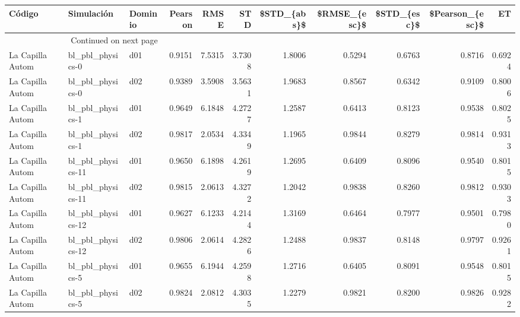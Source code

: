 \begin{longtable}{lllrrrrrrrr}
\toprule
                Código &            Simulación & Dominio &  Pearson &     RMSE &      STD &  \$STD\_\{abs\}\$ &  \$RMSE\_\{esc\}\$ &  \$STD\_\{esc\}\$ &  \$Pearson\_\{esc\}\$ &      ET \\
\midrule
\endhead
\midrule
\multicolumn{3}{r}{{Continued on next page}} \\
\midrule
\endfoot

\bottomrule
\endlastfoot
     La Capilla Autom  &      bl\_pbl\_physics-0 &     d01 &   0.9151 &   7.5315 &   3.7308 &       1.8006 &        0.5294 &       0.6763 &           0.8716 &  0.6924 \\
     La Capilla Autom  &      bl\_pbl\_physics-0 &     d02 &   0.9389 &   3.5908 &   3.5631 &       1.9683 &        0.8567 &       0.6342 &           0.9109 &  0.8006 \\
     La Capilla Autom  &      bl\_pbl\_physics-1 &     d01 &   0.9649 &   6.1848 &   4.2727 &       1.2587 &        0.6413 &       0.8123 &           0.9538 &  0.8025 \\
     La Capilla Autom  &      bl\_pbl\_physics-1 &     d02 &   0.9817 &   2.0534 &   4.3349 &       1.1965 &        0.9844 &       0.8279 &           0.9814 &  0.9313 \\
     La Capilla Autom  &     bl\_pbl\_physics-11 &     d01 &   0.9650 &   6.1898 &   4.2619 &       1.2695 &        0.6409 &       0.8096 &           0.9540 &  0.8015 \\
     La Capilla Autom  &     bl\_pbl\_physics-11 &     d02 &   0.9815 &   2.0613 &   4.3272 &       1.2042 &        0.9838 &       0.8260 &           0.9812 &  0.9303 \\
     La Capilla Autom  &     bl\_pbl\_physics-12 &     d01 &   0.9627 &   6.1233 &   4.2144 &       1.3169 &        0.6464 &       0.7977 &           0.9501 &  0.7980 \\
     La Capilla Autom  &     bl\_pbl\_physics-12 &     d02 &   0.9806 &   2.0614 &   4.2826 &       1.2488 &        0.9837 &       0.8148 &           0.9797 &  0.9261 \\
     La Capilla Autom  &      bl\_pbl\_physics-5 &     d01 &   0.9655 &   6.1944 &   4.2598 &       1.2716 &        0.6405 &       0.8091 &           0.9548 &  0.8015 \\
     La Capilla Autom  &      bl\_pbl\_physics-5 &     d02 &   0.9824 &   2.0812 &   4.3035 &       1.2279 &        0.9821 &       0.8200 &           0.9826 &  0.9282 \\

\end{longtable}
